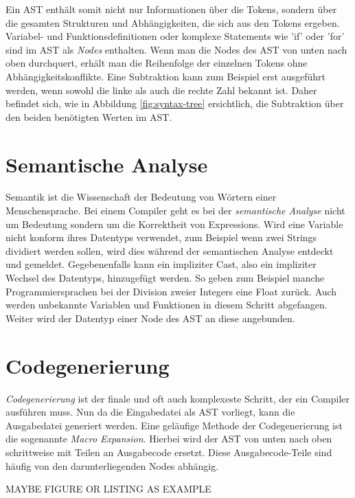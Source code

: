 Ein AST enthält somit nicht nur Informationen über die Tokens, sondern über die gesamten Strukturen und Abhängigkeiten, die sich aus den Tokens ergeben. Variabel- und Funktionsdefinitionen oder komplexe Statements wie 'if' oder 'for'
sind im AST als \textit{Nodes} enthalten. Wenn man die Nodes des AST von unten nach oben durchquert, erhält man die Reihenfolge der einzelnen Tokens ohne Abhängigkeitskonflikte.
Eine Subtraktion kann zum Beispiel erst ausgeführt werden, wenn sowohl die linke als auch die rechte Zahl bekannt ist.
Daher befindet sich, wie in Abbildung \ref{fig:syntax-tree} ersichtlich, die Subtraktion über den beiden benötigten Werten im AST.

\section{Semantische Analyse}
Semantik ist die Wissenschaft der Bedeutung von Wörtern einer Menschensprache. Bei einem Compiler geht es bei der \textit{semantische Analyse} nicht um Bedeutung sondern um die Korrektheit von Expressions.
Wird eine Variable nicht konform ihres Datentyps verwendet, zum Beispiel wenn zwei Strings dividiert werden sollen, wird dies während der semantischen Analyse entdeckt und gemeldet.
Gegebenenfalls kann ein impliziter Cast, also ein impliziter Wechsel des Datentyps, hinzugefügt werden.
So geben zum Beispiel manche Programmiersprachen bei der Division zweier Integers eine Float zurück.
Auch werden unbekannte Variablen und Funktionen in diesem Schritt abgefangen.
Weiter wird der Datentyp einer Node des AST an diese angebunden.

\section{Codegenerierung} \label{sec:traditional_code_generation}
\textit{Codegenerierung} ist der finale und oft auch komplexeste Schritt, der ein Compiler ausführen muss.
Nun da die Eingabedatei als AST vorliegt, kann die Ausgabedatei generiert werden. Eine geläufige Methode der Codegenerierung ist die sogenannte \textit{Macro Expansion}.
Hierbei wird der AST von unten nach oben schrittweise mit Teilen an Ausgabecode ersetzt.
Diese Ausgabecode-Teile sind häufig von den darunterliegenden Nodes abhängig. 

MAYBE FIGURE OR LISTING AS EXAMPLE

